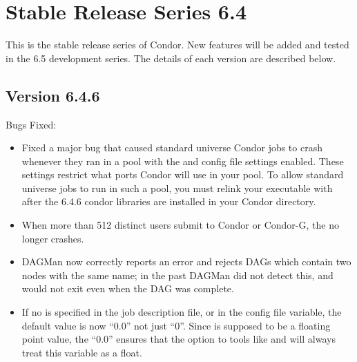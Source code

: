\section{\label{sec:History-6-4}Stable Release Series 6.4}

This is the stable release series of Condor.
New features will be added and tested in the 6.5 development series. 
The details of each version are described below.

\subsection{\label{sec:New-6-4-6}Version 6.4.6}

\noindent Bugs Fixed:
\begin{itemize}

\item Fixed a major bug that caused standard universe Condor jobs to
crash whenever they ran in a pool with the  and
 config file settings enabled.
These settings restrict what ports Condor will use in your pool.
To allow standard universe jobs to run in such a pool, you must relink
your executable with  after the 6.4.6 condor libraries
are installed in your Condor  directory.

\item When more than 512 distinct users submit to Condor or Condor-G,
the  no longer crashes. 

\item DAGMan now correctly reports an error and rejects DAGs
which contain two nodes with the same name; in the past DAGMan
did not detect this, and would not exit even when the DAG was
complete.

\item If no  is specified in the job description file, or
in the  config file variable, the default value
is now ``0.0'' not just ``0''.
Since  is supposed to be a floating point value, the
``0.0'' ensures that the  option to tools like 
and  will always treat this variable as a float.

\end{itemize}

